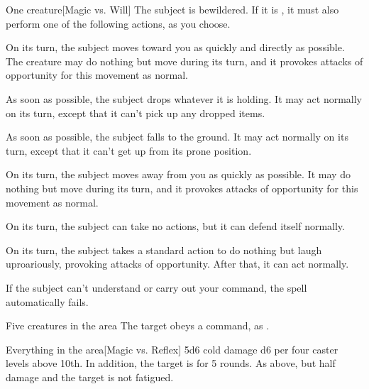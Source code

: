 \spellrng{\rngmed}
\begin{spelltarget}{One creature}[Magic vs. Will]
    \spellsuccess The subject is bewildered. If it is \bloodied, it must also perform one of the following actions, as you choose.
    \par {} On its turn, the subject moves toward you as quickly and directly as possible. The creature may do nothing but move during its turn, and it provokes attacks of opportunity for this movement as normal.
    \par {} As soon as possible, the subject drops whatever it is holding. It may act normally on its turn, except that it can't pick up any dropped items.
    \par {} As soon as possible, the subject falls to the ground. It may act normally on its turn, except that it can't get up from its prone position.
    \par {} On its turn, the subject moves away from you as quickly as possible. It may do nothing but move during its turn, and it provokes attacks of opportunity for this movement as normal.
    \par {} On its turn, the subject can take no actions, but it can defend itself normally.
    \par {} On its turn, the subject takes a standard action to do nothing but laugh uproariously, provoking attacks of opportunity. After that, it can act normally.
\end{spelltarget}
\spellnotes If the subject can't understand or carry out your command, the spell automatically fails.

\spellrng{\rngmed}
\begin{spelltarget}{Five creatures in the area}
    \spellsuccess The target obeys a command, as .
\end{spelltarget}

\begin{spelltarget}{Everything in the area}[Magic vs. Reflex]
    \spellsuccess 5d6 cold damage \add d6 per four caster levels above 10th. In addition, the target is \fatigued for 5 rounds.
    \spellfailure As above, but half damage and the target is not fatigued.
\end{spelltarget}
\spellnotes \destructivespellnotes

